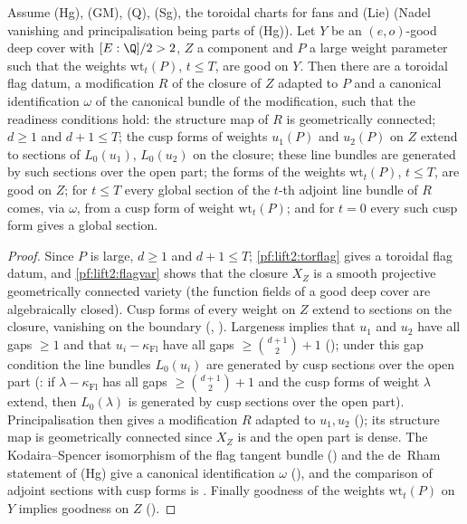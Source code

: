 \begin{proposition}\label{pf:lift2:hsready}
Assume \textup{(Hg)}, \textup{(GM)}, \textup{(Q)}, \textup{(Sg)}, the toroidal charts for fans and \textup{(Lie)} (Nadel
vanishing and principalisation being parts of \textup{(Hg)}). Let $Y$ be an $(e,o)$-good deep cover with $[E:\Q]/2>2$,
$Z$ a component and $P$ a large weight parameter such that the weights $\mathrm{wt}_t(P)$, $t\le T$, are good on $Y$. Then
there are a toroidal flag datum, a modification $R$ of the closure of $Z$ adapted to $P$ and a canonical identification
$\omega$ of the canonical bundle of the modification, such that the readiness conditions hold: the structure map of $R$ is
geometrically connected; $d\ge1$ and $d+1\le T$; the cusp forms of weights $u_1(P)$ and $u_2(P)$ on $Z$ extend to sections
of $L_0(u_1)$, $L_0(u_2)$ on the closure; these line bundles are generated by such sections over the open part; the forms
of the weights $\mathrm{wt}_t(P)$, $t\le T$, are good on $Z$; for $t\le T$ every global section of the $t$-th adjoint line
bundle of $R$ comes, via $\omega$, from a cusp form of weight $\mathrm{wt}_t(P)$; and for $t=0$ every such cusp form gives a
global section.
\end{proposition}

\begin{proof}
Since $P$ is large, $d\ge1$ and $d+1\le T$; \cref{pf:lift2:torflag} gives a toroidal flag datum, and \cref{pf:lift2:flagvar}
shows that the closure $X_Z$ is a smooth projective geometrically connected variety (the function fields of a good deep
cover are algebraically closed). Cusp forms of every weight on $Z$ extend to sections on the closure, vanishing on the
boundary (,
). Largeness implies that $u_1$ and $u_2$ have all gaps $\ge1$ and that
$u_i-\kappa_{\mathrm{Fl}}$ have all gaps $\ge\binom{d+1}2+1$ (); under this gap
condition the line bundles $L_0(u_i)$ are generated by cusp sections over the open part
(: if $\lambda-\kappa_{\mathrm{Fl}}$ has all gaps
$\ge\binom{d+1}2+1$ and the cusp forms of weight $\lambda$ extend, then $L_0(\lambda)$ is generated by cusp sections over the
open part). Principalisation then gives a modification $R$ adapted to $u_1,u_2$
(); its structure map is geometrically connected since $X_Z$ is and the
open part is dense. The Kodaira--Spencer isomorphism of the flag tangent bundle
() and the de~Rham statement of \textup{(Hg)} give a canonical
identification $\omega$ (), and the comparison of adjoint sections with cusp
forms is . Finally goodness of the weights $\mathrm{wt}_t(P)$ on $Y$
implies goodness on $Z$ ().
\end{proof}

